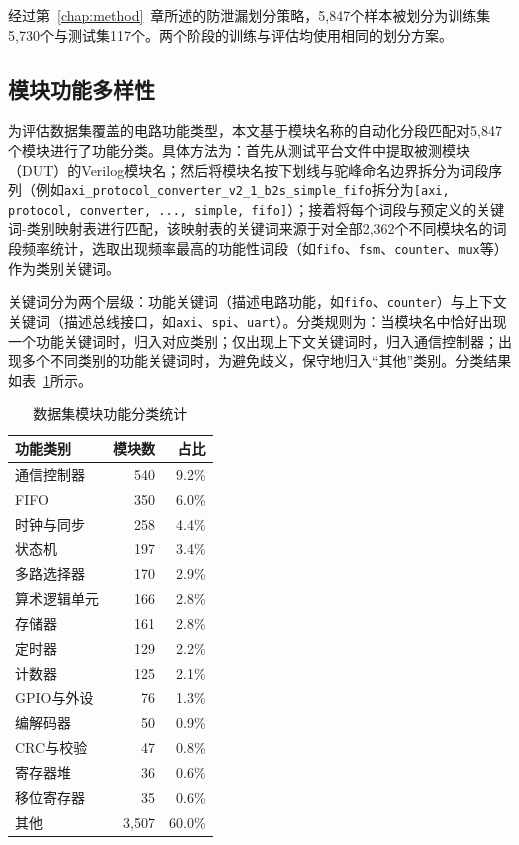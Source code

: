 经过第~\ref{chap:method}~章所述的防泄漏划分策略，5{,}847个样本被划分为训练集5{,}730个与测试集117个。两个阶段的训练与评估均使用相同的划分方案。

\subsection{模块功能多样性}

为评估数据集覆盖的电路功能类型，本文基于模块名称的自动化分段匹配对5{,}847个模块进行了功能分类。具体方法为：首先从测试平台文件中提取被测模块（DUT）的Verilog模块名；然后将模块名按下划线与驼峰命名边界拆分为词段序列（例如\texttt{axi\_protocol\_converter\_v2\_1\_b2s\_simple\_fifo}拆分为\texttt{[axi, protocol, converter, ..., simple, fifo]}）；接着将每个词段与预定义的关键词-类别映射表进行匹配，该映射表的关键词来源于对全部2{,}362个不同模块名的词段频率统计，选取出现频率最高的功能性词段（如\texttt{fifo}、\texttt{fsm}、\texttt{counter}、\texttt{mux}等）作为类别关键词。

关键词分为两个层级：功能关键词（描述电路功能，如\texttt{fifo}、\texttt{counter}）与上下文关键词（描述总线接口，如\texttt{axi}、\texttt{spi}、\texttt{uart}）。分类规则为：当模块名中恰好出现一个功能关键词时，归入对应类别；仅出现上下文关键词时，归入通信控制器；出现多个不同类别的功能关键词时，为避免歧义，保守地归入“其他”类别。分类结果如表~\ref{tab:module-category}所示。

\begin{table}[htbp]
  \centering
  \caption{数据集模块功能分类统计}
  \label{tab:module-category}
  \begin{tabular}{lrr}
    \toprule
    功能类别 & 模块数 & 占比 \\
    \midrule
    通信控制器 & 540 & 9.2\% \\
    FIFO & 350 & 6.0\% \\
    时钟与同步 & 258 & 4.4\% \\
    状态机 & 197 & 3.4\% \\
    多路选择器 & 170 & 2.9\% \\
    算术逻辑单元 & 166 & 2.8\% \\
    存储器 & 161 & 2.8\% \\
    定时器 & 129 & 2.2\% \\
    计数器 & 125 & 2.1\% \\
    GPIO与外设 & 76 & 1.3\% \\
    编解码器 & 50 & 0.9\% \\
    CRC与校验 & 47 & 0.8\% \\
    寄存器堆 & 36 & 0.6\% \\
    移位寄存器 & 35 & 0.6\% \\
    其他 & 3{,}507 & 60.0\% \\
    \bottomrule
  \end{tabular}
\end{table}

